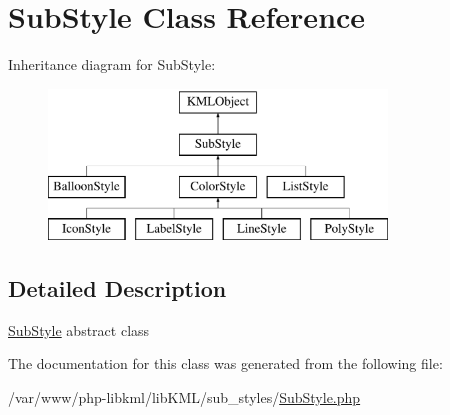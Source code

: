 \hypertarget{classSubStyle}{
\section{SubStyle Class Reference}
\label{d2/dba/classSubStyle}
}
Inheritance diagram for SubStyle:\begin{figure}[H]
\begin{center}
\leavevmode
\includegraphics[height=4.000000cm]{d2/dba/classSubStyle}
\end{center}
\end{figure}


\subsection{Detailed Description}
\hyperlink{classSubStyle}{SubStyle} abstract class 

The documentation for this class was generated from the following file:\begin{DoxyCompactItemize}
\item 
/var/www/php-\/libkml/libKML/sub\_\-styles/\hyperlink{SubStyle_8php}{SubStyle.php}\end{DoxyCompactItemize}
